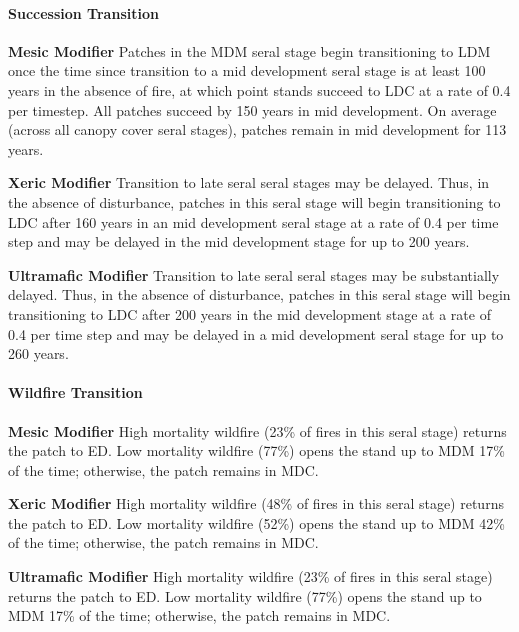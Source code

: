 \paragraph{Succession Transition}
\begin{adjustwidth}{2cm}{}
\textbf{Mesic Modifier }  Patches in the MDM seral stage begin transitioning to LDM once the time since transition to a mid development seral stage is at least 100 years in the absence of fire, at which point stands succeed to LDC at a rate of 0.4 per timestep. All patches succeed by 150 years in mid development. On average (across all canopy cover seral stages), patches remain in mid development for 113 years.

\medskip
\noindent \textbf{Xeric Modifier}  Transition to late seral seral stages may be delayed. Thus, in the absence of disturbance, patches in this seral stage will begin transitioning to LDC after 160 years in an mid development seral stage at a rate of 0.4 per time step and may be delayed in the mid development stage for up to 200 years. 

\medskip
\noindent \textbf{Ultramafic Modifier} Transition to late seral seral stages may be substantially delayed. Thus, in the absence of disturbance, patches in this seral stage will begin transitioning to LDC after 200 years in the mid development stage at a rate of 0.4 per time step and may be delayed in a mid development seral stage for up to 260 years.

\end{adjustwidth}

\paragraph{Wildfire Transition}
\begin{adjustwidth}{2cm}{}
\textbf{Mesic Modifier } High mortality wildfire (23\% of fires in this seral stage) returns the patch to ED. Low mortality wildfire (77\%) opens the stand up to MDM 17\% of the time; otherwise, the patch remains in MDC. 

\medskip
\noindent \textbf{Xeric Modifier} High mortality wildfire (48\% of fires in this seral stage) returns the patch to ED. Low mortality wildfire (52\%) opens the stand up to MDM 42\% of the time; otherwise, the patch remains in MDC.

\medskip
\noindent \textbf{Ultramafic Modifier} High mortality wildfire (23\% of fires in this seral stage) returns the patch to ED. Low mortality wildfire (77\%) opens the stand up to MDM 17\% of the time; otherwise, the patch remains in MDC.

\end{adjustwidth}

